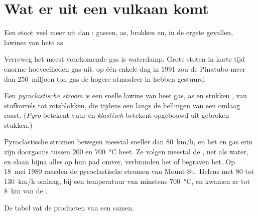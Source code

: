\section{Wat er uit een vulkaan komt}

Een  stoot veel meer uit dan : gassen, as, brokken 
en, in de ergste gevallen, lawines van hete as.

Verreweg het meest voorkomende gas is waterdamp. Grote  stoten
in korte tijd enorme hoeveelheden gas uit: op één enkele dag in 1991 zou de
Pinatubo meer dan 250~miljoen ton gas de hogere atmosfeer in hebben
gestuurd.

\begin{definition}\label{def:g7:volcanoes:pyroclastic-flow}
Een \emph{pyroclastische stroom} is een snelle
lawine van heet gas, as en stukken , van stofkorrels tot
rotsblokken, die tijdens een  langs de hellingen van
een  omlaag raast. (\emph{Pyro} betekent vuur en \emph{klastisch}
betekent opgebouwd uit gebroken stukken.)
\end{definition}

Pyroclastische stromen bewegen meestal sneller dan \qty{80}{km/h}, en het
 en gas erin zijn doorgaans tussen 200 en
\qty{700}{\degreeCelsius} heet. Ze volgen meestal de , net als water,
en slaan bijna alles op hun pad omver, verbranden het of begraven het. Op
18~mei 1980 raasden de pyroclastische stromen van Mount St.~Helens met 80
tot \qty{130}{km/h} omlaag, bij een temperatuur van minstens
\qty{700}{\degreeCelsius}, en kwamen ze tot \qty{8}{km} van de .

De tabel vat de producten van een  samen.

